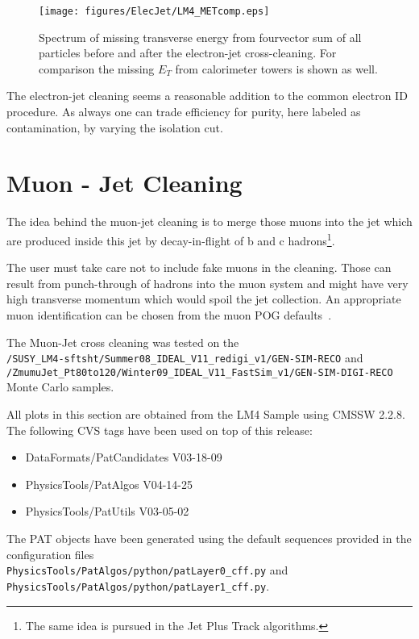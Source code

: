 \documentclass{cmspaper}
\begin{document}
\begin{figure}[hb]
\begin{center}
    \texttt{[image: figures/ElecJet/LM4\_METcomp.eps]}
    \caption{Spectrum of missing transverse energy from fourvector sum of all
    particles before and after the electron-jet cross-cleaning. For comparison
    the missing $E_T$ from calorimeter towers is shown as well.}
\label{fig:met_ElecJet}
\end{center}
\end{figure}
The electron-jet cleaning seems a reasonable addition to the common
electron ID procedure. As always one can trade efficiency for purity, here
labeled as contamination, by varying the isolation cut.

\clearpage


\section{Muon - Jet Cleaning}
The idea behind the muon-jet cleaning is to merge those muons into the jet which
are produced inside this jet by decay-in-flight of b and c hadrons\footnote{The
same idea is pursued in the Jet Plus Track algorithms.}.

The user must take care not to include fake muons in the cleaning. Those can
result from punch-through of hadrons into the muon system and might have very
high transverse momentum which would spoil the jet collection. An appropriate
muon identification can be chosen from the muon POG defaults~\cite{muonID}.

The Muon-Jet cross cleaning was tested on the\\
\texttt{/SUSY\_LM4-sftsht/Summer08\_IDEAL\_V11\_redigi\_v1/GEN-SIM-RECO} and\\
\texttt{/ZmumuJet\_Pt80to120/Winter09\_IDEAL\_V11\_FastSim\_v1/GEN-SIM-DIGI-RECO}
Monte Carlo samples.

All plots in this section are obtained from the LM4 Sample using CMSSW 2.2.8.
The following CVS tags have been used on top of this release:
\begin{itemize}
    \item DataFormats/PatCandidates V03-18-09      
    \item PhysicsTools/PatAlgos     V04-14-25      
    \item PhysicsTools/PatUtils     V03-05-02      
\end{itemize}
The PAT objects
have been generated using the default sequences provided in the configuration
files\\
\texttt{PhysicsTools/PatAlgos/python/patLayer0\_cff.py} and\\
\texttt{PhysicsTools/PatAlgos/python/patLayer1\_cff.py}.
\end{document}
